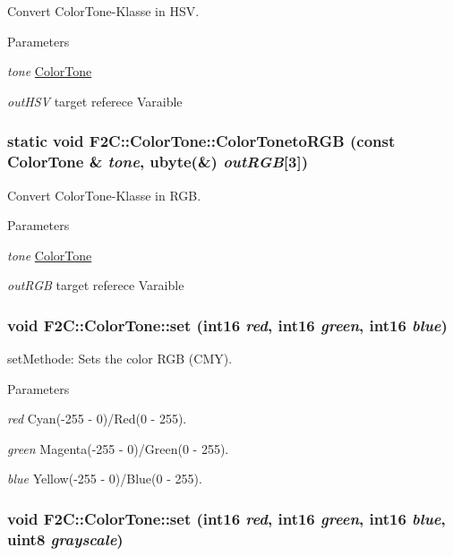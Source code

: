 Convert ColorTone-\/Klasse in HSV. 
\begin{DoxyParams}{Parameters}
\item[{\em tone}]\hyperlink{class_f2_c_1_1_color_tone}{ColorTone} \item[{\em outHSV}]target referece Varaible \end{DoxyParams}
\hypertarget{class_f2_c_1_1_color_tone_a55e96167a3106b92bfa8b28bb098b2bc}{
\subsubsection[{ColorTonetoRGB}]{\setlength{\rightskip}{0pt plus 5cm}static void F2C::ColorTone::ColorTonetoRGB (const {\bf ColorTone} \& {\em tone}, \/  {\bf ubyte}(\&) {\em outRGB}\mbox{[}3\mbox{]})}}
\label{class_f2_c_1_1_color_tone_a55e96167a3106b92bfa8b28bb098b2bc}


Convert ColorTone-\/Klasse in RGB. 
\begin{DoxyParams}{Parameters}
\item[{\em tone}]\hyperlink{class_f2_c_1_1_color_tone}{ColorTone} \item[{\em outRGB}]target referece Varaible \end{DoxyParams}
\hypertarget{class_f2_c_1_1_color_tone_a687200e3fcb535f53b37e6ed664ac1b9}{
\subsubsection[{set}]{\setlength{\rightskip}{0pt plus 5cm}void F2C::ColorTone::set ({\bf int16} {\em red}, \/  {\bf int16} {\em green}, \/  {\bf int16} {\em blue})}}
\label{class_f2_c_1_1_color_tone_a687200e3fcb535f53b37e6ed664ac1b9}


setMethode: Sets the color RGB (CMY). 
\begin{DoxyParams}{Parameters}
\item[{\em red}]Cyan(-\/255 -\/ 0)/Red(0 -\/ 255). \item[{\em green}]Magenta(-\/255 -\/ 0)/Green(0 -\/ 255). \item[{\em blue}]Yellow(-\/255 -\/ 0)/Blue(0 -\/ 255). \end{DoxyParams}
\hypertarget{class_f2_c_1_1_color_tone_afd52bb767904712a68742e770619d7e8}{
\subsubsection[{set}]{\setlength{\rightskip}{0pt plus 5cm}void F2C::ColorTone::set ({\bf int16} {\em red}, \/  {\bf int16} {\em green}, \/  {\bf int16} {\em blue}, \/  {\bf uint8} {\em grayscale})}}
\label{class_f2_c_1_1_color_tone_afd52bb767904712a68742e770619d7e8}


